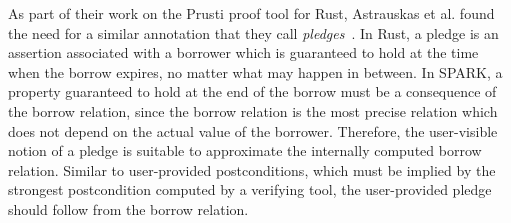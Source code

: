 \documentclass[runningheads]{llncs}
\begin{document}
As part of their work on the Prusti proof tool for Rust, Astrauskas et al. found the need for a similar annotation that they call \emph{pledges}~\cite{astrauskas2019leveraging}. In Rust, a pledge is an assertion associated with a borrower which is guaranteed to hold at the time when the borrow expires, no matter what may happen in between. In SPARK, a property guaranteed to hold at the end of the borrow must be a consequence of the borrow relation, since the borrow relation is the most precise relation which does not depend on the actual value of the borrower. Therefore, the user-visible notion of a pledge is suitable to approximate the internally computed borrow relation. Similar to user-provided postconditions, which must be implied by the strongest postcondition computed by a verifying tool, the user-provided pledge should follow from the borrow relation.
\end{document}
